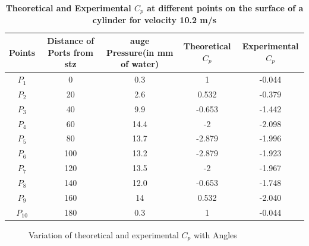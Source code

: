 \documentclass[12pt,a4paper]{article}
\begin{document}
\begin{table}[ht]
\centering
\caption{\textbf{Theoretical and Experimental $C_p$ at different points on the surface of a cylinder for velocity 10.2 m/s}}
\vspace{2mm}
\begin{flushleft}
\begin{tabular}{|c{5 mm}|c{15 mm}|c{15 mm}|c{15 mm}|c{15 mm}|} 
 \hline
Points & Distance of Ports from stz & auge Pressure(in mm of water) & Theoretical $C_p$ & Experimental $C_p$\\ [0.01ex] 
 \hline
$P_1$ & 0 & 0.3  & 1 & -0.044 \\ 
 \hline
$P_2$ & 20 & 2.6 & 0.532 & -0.379  \\
 \hline
$P_3$ & 40 & 9.9 & -0.653 & -1.442  \\
 \hline
$P_4$ & 60 & 14.4 & -2 & -2.098  \\
 \hline
$P_5$ & 80 & 13.7 & -2.879 & -1.996  \\
 \hline
$P_6$ & 100 & 13.2 & -2.879 & -1.923 \\ 
 \hline
$P_7$ & 120 & 13.5 & -2 & -1.967 \\ 
 \hline
$P_8$ & 140 & 12.0 & -0.653 & -1.748\\
 \hline
$P_9$ & 160 & 14 & 0.532 & -2.040\\
 \hline
$P_{10}$ & 180 & 0.3 & 1 & -0.044 \\ 
 \hline 


\end{tabular}
\end{flushleft}
\end{table}

\begin{figure}[!ht]
	\begin{center}
	\end{center}
	\caption{Variation of theoretical and experimental $C_p$ with Angles}
\end{figure}
\end{document}
